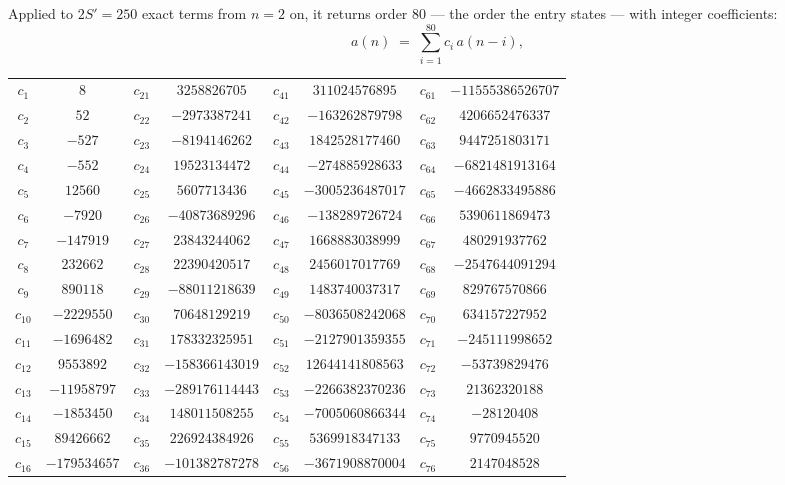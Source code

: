 \documentclass[11pt,a4paper]{article}
\theoremstyle{plain}
\theoremstyle{definition}
\begin{document}
Applied to $2S'=250$ exact terms from $n=2$ on, it returns order $80$ --- the
order the entry states --- with integer coefficients:
\[
a(n)\;=\;\sum_{i=1}^{80}c_i\,a(n-i),
\]
\begin{center}\small
\begin{tabular}{cccccccc}
$c_{1}$ & $8$ & $c_{21}$ & $3258826705$ & $c_{41}$ & $311024576895$ & $c_{61}$ & $-11555386526707$ \\
$c_{2}$ & $52$ & $c_{22}$ & $-2973387241$ & $c_{42}$ & $-163262879798$ & $c_{62}$ & $4206652476337$ \\
$c_{3}$ & $-527$ & $c_{23}$ & $-8194146262$ & $c_{43}$ & $1842528177460$ & $c_{63}$ & $9447251803171$ \\
$c_{4}$ & $-552$ & $c_{24}$ & $19523134472$ & $c_{44}$ & $-274885928633$ & $c_{64}$ & $-6821481913164$ \\
$c_{5}$ & $12560$ & $c_{25}$ & $5607713436$ & $c_{45}$ & $-3005236487017$ & $c_{65}$ & $-4662833495886$ \\
$c_{6}$ & $-7920$ & $c_{26}$ & $-40873689296$ & $c_{46}$ & $-138289726724$ & $c_{66}$ & $5390611869473$ \\
$c_{7}$ & $-147919$ & $c_{27}$ & $23843244062$ & $c_{47}$ & $1668883038999$ & $c_{67}$ & $480291937762$ \\
$c_{8}$ & $232662$ & $c_{28}$ & $22390420517$ & $c_{48}$ & $2456017017769$ & $c_{68}$ & $-2547644091294$ \\
$c_{9}$ & $890118$ & $c_{29}$ & $-88011218639$ & $c_{49}$ & $1483740037317$ & $c_{69}$ & $829767570866$ \\
$c_{10}$ & $-2229550$ & $c_{30}$ & $70648129219$ & $c_{50}$ & $-8036508242068$ & $c_{70}$ & $634157227952$ \\
$c_{11}$ & $-1696482$ & $c_{31}$ & $178332325951$ & $c_{51}$ & $-2127901359355$ & $c_{71}$ & $-245111998652$ \\
$c_{12}$ & $9553892$ & $c_{32}$ & $-158366143019$ & $c_{52}$ & $12644141808563$ & $c_{72}$ & $-53739829476$ \\
$c_{13}$ & $-11958797$ & $c_{33}$ & $-289176114443$ & $c_{53}$ & $-2266382370236$ & $c_{73}$ & $21362320188$ \\
$c_{14}$ & $-1853450$ & $c_{34}$ & $148011508255$ & $c_{54}$ & $-7005060866344$ & $c_{74}$ & $-28120408$ \\
$c_{15}$ & $89426662$ & $c_{35}$ & $226924384926$ & $c_{55}$ & $5369918347133$ & $c_{75}$ & $9770945520$ \\
$c_{16}$ & $-179534657$ & $c_{36}$ & $-101382787278$ & $c_{56}$ & $-3671908870004$ & $c_{76}$ & $2147048528$ \\

\end{tabular}
\end{center}
\end{document}
